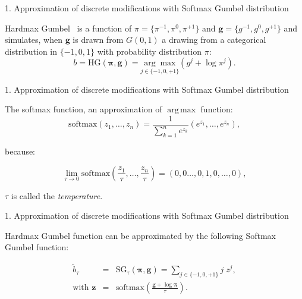 \documentclass[10pt,aspectratio=169]{beamer}
\renewcommand{\vec}[1]{\mathbf{#1}}
\DeclareMathOperator*{\argmax}{arg\,max}
\begin{document}
\begin{frame}{1. Approximation of discrete modifications with Softmax Gumbel distribution}

\begin{tcolorbox}[colback=lightgreen,colframe=greentheme,title=\textbf{Definition} (Hardmax Gumbel Function)]

Hardmax Gumbel~ is a function of  $\pi = \{\pi^{-1},\pi^{0}, \pi^{+1}\}$ and $\vec{g} = \{g^{-1},g^{0}, g^{+1}\}$ and simulates, when $\vec{g}$ is drawn from $G(0,1)$ a drawing from a categorical distribution in $\{-1,0,1\}$ with probability distribution $\pi$:  
    \begin{equation}
\label{eq:gumbel}
b = \mbox{HG}(\bm{\pi}, \vec{g}) = \underset{{j \in \{-1,0,+1\}}}{\arg \max} (g^j+ \log \pi^j).
\end{equation}
\end{tcolorbox}

\end{frame}

\begin{frame}{1. Approximation of discrete modifications with Softmax Gumbel distribution}
    
The softmax function, an approximation of $\argmax$ function:
$$ \mbox{softmax}\left(z_1,\ldots,z_n\right) = \frac{1}{\sum_{k=1}^n e^{z_k}}(e^{z_1},\ldots,e^{z_n}),$$

because: 

$$
\lim_{\tau \rightarrow 0} \mbox{softmax}\left(\frac{z_1}{\tau},\ldots,\frac{z_n}{\tau}\right) = (0,0\ldots,0,1,0,\dots, 0), 
$$

\pause
$\tau$ is called the \emph{temperature}.
\end{frame}

\begin{frame}{1. Approximation of discrete modifications with Softmax Gumbel distribution}
\begin{tcolorbox}[colback=lightgreen,colframe=greentheme,title=\textbf{Definition} (Softmax Gumbel Function)]

Hardmax Gumbel function can be approximated by the following Softmax Gumbel function: 

\begin{eqnarray}\label{eq:softmaxgumbel} 
\tilde{b}_{\tau} &=& \mbox{SG}_\tau(\bm{\pi}, \vec{g}) = \sum_{j \in \{-1,0,+1\}} j\;z^j,\\
\text{with } \vec{z} &=& \mbox{softmax}\left(\frac{\vec{g}+\log \bm{\pi}}{\tau}\right).
\end{eqnarray}

\end{tcolorbox}
\end{frame}
\end{document}
